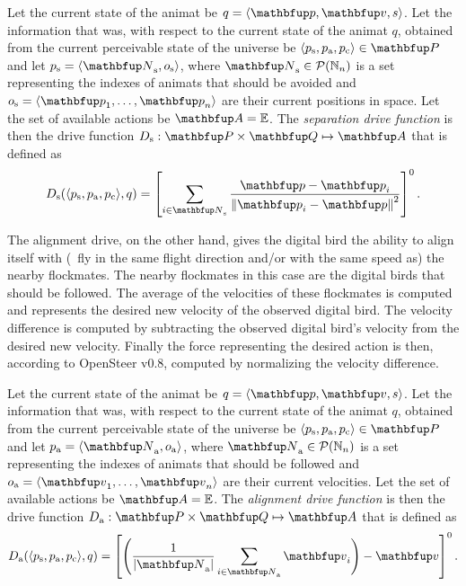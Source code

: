 \begin{definition}
\label{def:animat:Ds:cwr}
Let the current state of the animat be $q=\langle\vect{p},\vect{v},s\rangle$. Let the information that was, with respect to the current state of the animat $q$, obtained from the current perceivable state of the universe be $\langle p_\textnormal{s},p_\textnormal{a},p_\textnormal{c}\rangle \in \set{P}$ and let $p_\textnormal{s}=\langle\set{N}_\textnormal{s},o_\textnormal{s}\rangle$, where $\set{N}_\textnormal{s} \in \powset{\N_n}$ is a set representing the indexes of animats that should be avoided and $o_\textnormal{s}=\langle\vect{p}_1,\ldots,\vect{p}_n\rangle$ are their current positions in space. Let the set of available actions be $\set{A}=\E$. The \emph{separation drive function} is then the drive function $D_\textnormal{s}: \set{P} \times \set{Q} \mapsto \set{A}$ that is defined as 
\begin{equation}
D_\textnormal{s}(\langle p_\textnormal{s},p_\textnormal{a},p_\textnormal{c}\rangle, q) = \left[ \sum_{i \in \set{N}_\textnormal{s}} \frac{\vect{p}-\vect{p}_i}{{\left\|\vect{p}_i-\vect{p}\right\|}^2} \right]^0. \label{eq:animat:Ds:cwr}
\end{equation}
\end{definition}

The alignment drive, on the other hand, gives the digital bird the ability to align itself with (\ie\ fly in the same flight direction and/or with the same speed as) the nearby flockmates. The nearby flockmates in this case are the digital birds that should be followed. The average of the velocities of these flockmates is computed and represents the desired new velocity of the observed digital bird. The velocity difference is computed by subtracting the observed digital bird's velocity from the desired new velocity. Finally the force representing the desired action is then, according to OpenSteer v0.8, computed by normalizing the velocity difference.

\begin{definition}
\label{def:animat:Da:cwr}
Let the current state of the animat be $q=\langle\vect{p},\vect{v},s\rangle$. Let the information that was, with respect to the current state of the animat $q$, obtained from the current perceivable state of the universe be $\langle p_\textnormal{s},p_\textnormal{a},p_\textnormal{c}\rangle \in \set{P}$ and let $p_\textnormal{a}=\langle\set{N}_\textnormal{a},o_\textnormal{a}\rangle$, where $\set{N}_\textnormal{a} \in \powset{\N_n}$ is a set representing the indexes of animats that should be followed and $o_\textnormal{a}=\langle\vect{v}_1,\ldots,\vect{v}_n\rangle$ are their current velocities. Let the set of available actions be $\set{A}=\E$. The \emph{alignment drive function} is then the drive function $D_\textnormal{a}: \set{P} \times \set{Q} \mapsto \set{A}$ that is defined as 
\begin{equation}
D_\textnormal{a}(\langle p_\textnormal{s},p_\textnormal{a},p_\textnormal{c}\rangle, q) = \left[ \Biggl( \frac{1}{\left|\set{N}_\textnormal{a}\right|} \sum_{i \in \set{N}_\textnormal{a}} \vect{v}_i \Biggr) - \vect{v} \right]^0. \label{eq:animat:Da:cwr}
\end{equation}
\end{definition}

